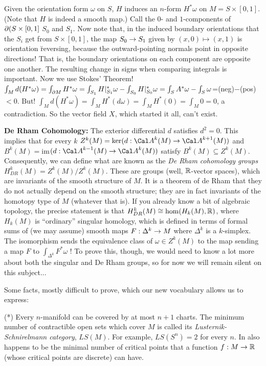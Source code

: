 Given the orientation form $\omega$ on $S$, $H$ induces 
an $n$-form $H^*\omega$ on $M=S\times [0,1]$. (Note that $H$ is indeed a smooth map.) 
Call the $0$- and $1$-components of $\partial(S\times [0,1]$ $S_0$ and $S_1$.
Now note that, in the induced boundary orientations that the $S_i$ get from $S\times [0,1]$, 
the map $S_0\rightarrow S_1$ given by $(x,0)\mapsto(x,1)$ is orientation \u{reversing}, because the 
outward-pointing normals point in opposite directions! That is, the boundary orientations on 
each component are opposite one another. The resulting change in signs when 
comparing integrals is important. Now we use Stokes' Theorem! 
$\int_M d(H^*\omega)=\int_{\partial M} H^*\omega=\int_{S_1}H|_{S_1}^*\omega - \int_{S_0}H|_{S_0}^*\omega
=\int_{S}A^*\omega - \int_{S}\omega$=(neg)$-$(pos)$<0$. But! $\int_M d(H^*\omega)=\int_M H^*(d\omega)
=\int_M H^*(0)=\int_M0=0$, a contradiction. So the vector field $X$, which started it all, can't
exist.

\msk

{\bf De Rham Cohomology:} The exterior differential $d$ satisfies $d^2=0$. This implies that for every $k$
$Z^k(M)=\ker(d:{\Cal A}^k(M)\ra {\Cal A}^{k+1}(M))$ and $B^k(M)=$im$(d:{\Cal A}^{k-1}(M)\ra {\Cal A}^{k}(M))$
satisfy $B^k(M)\subseteq Z^k(M)$. Consequently, we can define what are known as the {\it De Rham cohomology
groups} $H^k_{DR}(M)=Z^k(M)/Z^k(M)$. These are groups (well, ${\Bbb R}$-vector spaces), which are invariants of
the smooth structure of $M$. It is a theorem of de Rham that they do not actually depend on the
smooth structure; they are in fact invariants of the homotopy type of $M$ (whatever that is). If you
already know a bit of algebraic topology, the precise statement is that 
$H^k_{DR}(M)\cong \hom(H_k(M),{\Bbb R})$, where $H_k(M)$ is ``ordinary'' singular homology, which is defined
in terms of formal sums of (we may assume) smooth maps $F:\Delta^k\rightarrow M$ where $\Delta^k$ is a $k$-simplex.
The isomorphism sends the equivalence class of $\omega\in Z^k(M)$ to the map sending a map $F$ to 
$\int_{\Delta^k} F^*\omega$ ! To prove this, though, we would need to know a lot more about both the
singular and De Rham groups, so for now we will remain silent on this subject...

\bsk

\noindent Some facts, mostly difficult to prove, which our new vocabulary allows us to express:

\msk

\noindent (*) Every $n$-manifold can be covered by at most $n+1$ charts. The minimum number of contractible 
open sets which cover $M$ is
called its {\it Lusternik-Schnirelmann category}, $LS(M)$. For example, $LS(S^n)=2$ for every $n$.
In also happens to be the minimal number of critical points that a function $f:M\rightarrow {\Bbb R}$
(whose critical points are discrete) can have.

